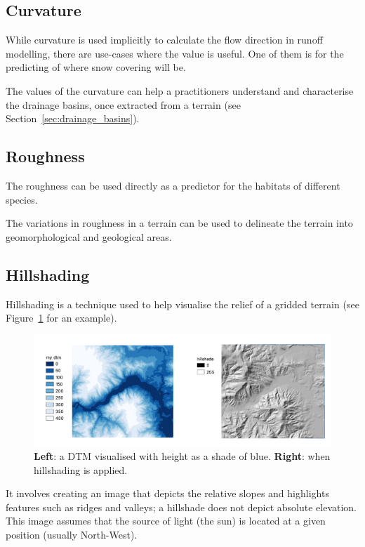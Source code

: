 \subsection{Curvature}%

While curvature is used implicitly to calculate the flow direction in runoff modelling, there are use-cases where the value is useful.
One of them is for the predicting of where snow covering will be.

The values of the curvature can help a practitioners understand and characterise the drainage basins, once extracted from a terrain (see Section~\ref{sec:drainage_basins}).



\subsection{Roughness}%

The roughness can be used directly as a predictor for the habitats of different species.

The variations in roughness in a terrain can be used to delineate the terrain into geomorphological and geological areas.


\subsection{Hillshading}%

Hillshading is a technique used to help visualise the relief of a gridded terrain (see Figure~\ref{fig:hillshade} for an example).
\begin{figure}
  \centering
  \includegraphics[width=\linewidth]{figs/hillshade}
  \caption{\textbf{Left}: a DTM visualised with height as a shade of blue. \textbf{Right}: when hillshading is applied.}%
\label{fig:hillshade}
\end{figure}
It involves creating an image that depicts the relative slopes and highlights features such as ridges and valleys; a hillshade does not depict absolute elevation.
This image assumes that the source of light (the sun) is located at a given position (usually North-West).

